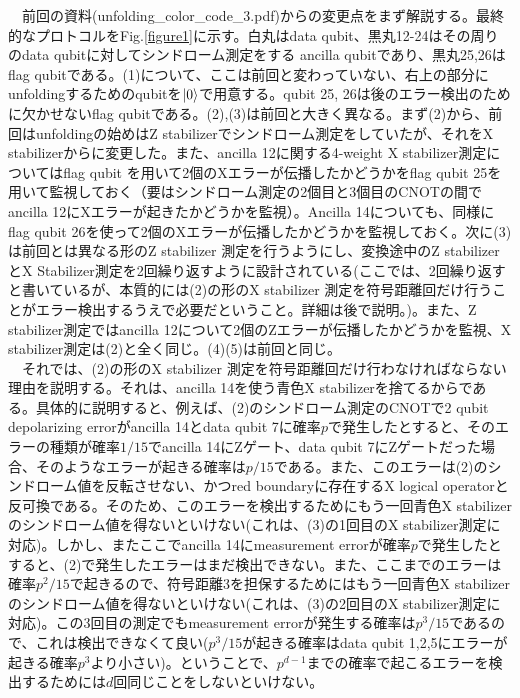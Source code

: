 \documentclass[a4paper,10pt]{ltjsarticle}
\begin{document}
{    　前回の資料(unfolding\_color\_code\_3.pdf)からの変更点をまず解説する。最終的なプロトコルをFig.\ref{figure1}に示す。白丸はdata qubit、黒丸12-24はその周りのdata qubitに対してシンドローム測定をする ancilla qubitであり、黒丸25,26はflag qubitである。(1)について、ここは前回と変わっていない、右上の部分にunfoldingするためのqubitを$\ket{0}$で用意する。qubit 25, 26は後のエラー検出のために欠かせないflag qubitである。(2),(3)は前回と大きく異なる。まず(2)から、前回はunfoldingの始めはZ stabilizerでシンドローム測定をしていたが、それをX stabilizerからに変更した。また、ancilla 12に関する4-weight X stabilizer測定についてはflag qubit を用いて2個のXエラーが伝播したかどうかをflag qubit 25を用いて監視しておく（要はシンドローム測定の2個目と3個目のCNOTの間でancilla 12にXエラーが起きたかどうかを監視）。Ancilla 14についても、同様にflag qubit 26を使って2個のXエラーが伝播したかどうかを監視しておく。次に(3)は前回とは異なる形のZ stabilizer 測定を行うようにし、変換途中のZ stabilizerとX Stabilizer測定を2回繰り返すように設計されている(ここでは、2回繰り返すと書いているが、本質的には(2)の形のX stabilizer 測定を符号距離回だけ行うことがエラー検出するうえで必要だということ。詳細は後で説明。)。また、Z stabilizer測定ではancilla 12について2個のZエラーが伝播したかどうかを監視、X stabilizer測定は(2)と全く同じ。(4)(5)は前回と同じ。\\
    　それでは、(2)の形のX stabilizer 測定を符号距離回だけ行わなければならない理由を説明する。それは、ancilla 14を使う青色X stabilizerを捨てるからである。具体的に説明すると、例えば、(2)のシンドローム測定のCNOTで2 qubit depolarizing errorがancilla 14とdata qubit 7に確率$p$で発生したとすると、そのエラーの種類が確率$1/15$でancilla 14にZゲート、data qubit 7にZゲートだった場合、そのようなエラーが起きる確率は$p/15$である。また、このエラーは(2)のシンドローム値を反転させない、かつred boundaryに存在するX logical operatorと反可換である。そのため、このエラーを検出するためにもう一回青色X stabilizerのシンドローム値を得ないといけない(これは、(3)の1回目のX stabilizer測定に対応)。しかし、またここでancilla 14にmeasurement errorが確率$p$で発生したとすると、(2)で発生したエラーはまだ検出できない。また、ここまでのエラーは確率$p^2/15$で起きるので、符号距離3を担保するためにはもう一回青色X stabilizerのシンドローム値を得ないといけない(これは、(3)の2回目のX stabilizer測定に対応)。この3回目の測定でもmeasurement errorが発生する確率は$p^3/15$であるので、これは検出できなくて良い($p^3/15$が起きる確率はdata qubit 1,2,5にエラーが起きる確率$p^3$より小さい)。ということで、$p^{d-1}$までの確率で起こるエラーを検出するためには$d$回同じことをしないといけない。\\
}
\end{document}
